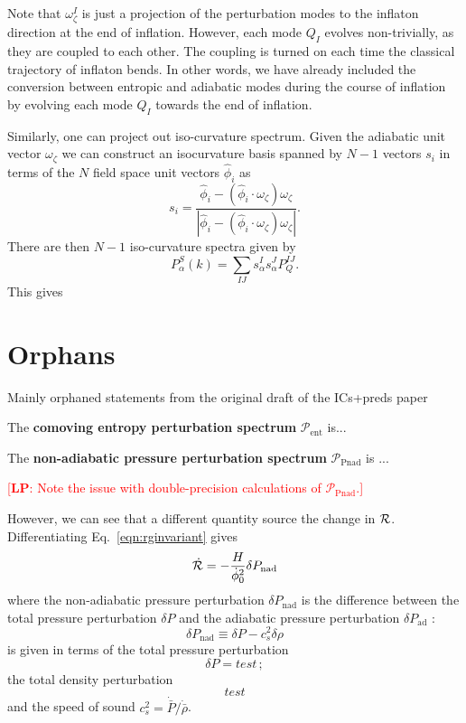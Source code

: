 \documentclass[11pt]{article}
\def\calR{{\cal R}}
\def\df {{\dot \phi_0}}
\def\Pent{{\mathcal P_\mathrm{ent}}}
\def\Ppnad{{\mathcal P_\mathrm{Pnad}}}
\newcommand{\lp}[1]{\textcolor{red}{[{\bf LP}: #1]}}
\begin{document}
Note that $\omega_\zeta^I$ is just a projection of the perturbation modes to the inflaton direction at the end of inflation. However, each mode $Q_I$ evolves non-trivially, as they are coupled to each other. The coupling is turned on each time the classical trajectory of inflaton bends. In other words, we have already included the conversion between entropic and adiabatic modes during the course of inflation by evolving each mode $Q_I$ towards the end of inflation. 

Similarly, one can project out iso-curvature spectrum.  Given the adiabatic unit vector $\omega_\zeta$ we can construct an isocurvature basis spanned by $N-1$ vectors $s_i$ in terms of the $N$ field space unit vectors $\hat \phi_i$ as
\begin{equation}
  s_i = \frac{\hat \phi_i - (\hat \phi_i \cdot \omega_\zeta) \omega_\zeta}{|\hat \phi_i - (\hat \phi_i \cdot \omega_\zeta) \omega_\zeta|}.
  \label{eqn:XXX}
\end{equation}
There are then $N-1$ iso-curvature spectra given by
\begin{equation}
  P_{\alpha}^S (k) = \sum_{IJ} s_\alpha^I s_\alpha^J P_Q^{IJ}.
\end{equation}
This gives 

\section{Orphans}

Mainly orphaned statements from the original draft of the ICs+preds paper

   The \textbf{comoving entropy perturbation spectrum} $\Pent$ is...

   The \textbf{non-adiabatic pressure perturbation spectrum} $\Ppnad$ is ...

    \lp{ Note the issue with double-precision calculations of $\mathcal P_\mathrm{Pnad}$.}

However, we can see that a different quantity source the change in $\calR$.  Differentiating Eq.~\eqref{eqn:rginvariant} gives
\begin{equation}
  \dot \calR = -\frac{H}{\df^2} \delta P_\mathrm{nad}
  \label{eqn:XXX}
\end{equation}
where the non-adiabatic pressure perturbation $\delta P_\mathrm{nad}$ is the difference between the total pressure perturbation $\delta P$ and the adiabatic pressure perturbation $\delta P_\mathrm{ad}$ :
\begin{equation}
  \delta P_\mathrm{nad} \equiv \delta P - c_s^2 \delta \rho
  \label{eqn:XXX}
\end{equation}
is  given in terms of the total pressure perturbation
\begin{equation}
  \delta P = test \, ;
  \label{eqn:XXX}
\end{equation}
the total density perturbation
\begin{equation}
  test
  \label{eqn:XXX}
\end{equation}
and the speed of sound $c_s^2 = \dot {\bar P} / \dot {\bar \rho}$.
\end{document}
